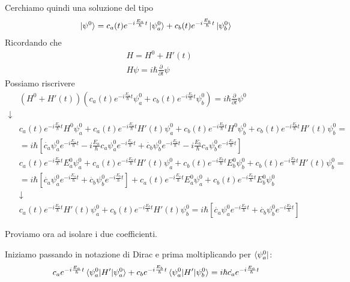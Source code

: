 Cerchiamo quindi una soluzione del tipo
\begin{align}
\ket{\psi^0}= c_a(t) e^{-i \frac{E_a}{\hbar}t} \ket{\psi^0_a} + c_b(t) e^{-i \frac{E_b}{\hbar}t} \ket{\psi^0_b}
\end{align}
Ricordando che
\begin{align}
&H= H^0 + H'(t) \\
&H\psi = i \hbar \frac{\partial}{\partial t} \psi
\end{align}
Possiamo riscrivere
\begin{align}
&(H^0 + H'(t))(c_a(t) e^{-i \frac{E_a}{\hbar}t} \psi^0_a + c_b(t) e^{-i \frac{E_b}{\hbar}t} \psi^0_b)=  i \hbar \frac{\partial}{\partial t} \psi^0\\
\downarrow \nonumber \\
& c_a(t) e^{-i \frac{E_a}{\hbar}t} H^0\psi^0_a + c_a(t) e^{-i \frac{E_a}{\hbar}t}H'(t)\psi^0_a +  c_b(t) e^{-i \frac{E_b}{\hbar}t} H^0\psi^0_b + c_b(t) e^{-i \frac{E_b}{\hbar}t}H'(t)\psi^0_b=  \nonumber \\
&=i\hbar \left[ \dot{c_a}\psi^0_a e^{-i \frac{E_a}{\hbar}t} -i\frac{E_a}{\hbar}c_a\psi^0_a e^{-i \frac{E_a}{\hbar}t} + 
\dot{c_b}\psi^0_b e^{-i \frac{E_b}{\hbar}t} -i\frac{E_b}{\hbar}c_a\psi^0_b e^{-i \frac{E_b}{\hbar}t}
\right]\\
&c_a(t) e^{-i \frac{E_a}{\hbar}t} E_a^0\psi^0_a + c_a(t) e^{-i \frac{E_a}{\hbar}t}H'(t)\psi^0_a +  c_b(t) e^{-i \frac{E_b}{\hbar}t} E_b^0\psi^0_b + c_b(t) e^{-i \frac{E_b}{\hbar}t}H'(t)\psi^0_b=  \nonumber \\
&= i\hbar \left[
\dot{c_a}\psi^0_a e^{-i \frac{E_a}{\hbar}t} + \dot{c_b}\psi^0_b e^{-i \frac{E_b}{\hbar}t}
\right]
+ c_a(t) e^{-i \frac{E_a}{\hbar}t} E_a^0\psi^0_a +  c_b(t) e^{-i \frac{E_b}{\hbar}t} E_b^0\psi^0_b \nonumber \\
&\downarrow \nonumber \\
&c_a(t) e^{-i \frac{E_a}{\hbar}t}H'(t)\psi^0_a + c_b(t) e^{-i \frac{E_b}{\hbar}t}H'(t)\psi^0_b= i\hbar \left[
\dot{c_a}\psi^0_a e^{-i \frac{E_a}{\hbar}t} + \dot{c_b}\psi^0_b e^{-i \frac{E_b}{\hbar}t}
\right]
\end{align}

Proviamo ora ad isolare i due coefficienti.

Iniziamo passando in notazione di Dirac e prima moltiplicando per $\bra{\psi_a^0}$:
\begin{align}
c_a e^{-i \frac{E_a}{\hbar}t} \braket{\psi_a^0|H'|\psi_a^0} + 
c_b e^{-i \frac{E_b}{\hbar}t} \braket{\psi_a^0|H'|\psi_b^0} = i \hbar \dot{c_a} e^{-i \frac{E_a}{\hbar}t}
\end{align}

